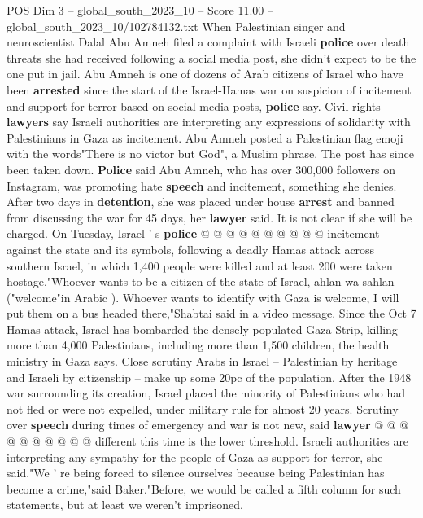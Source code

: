 \begin{textsample}{POS Dim 3 – global\_south\_2023\_10 – Score 11.00 – global\_south\_2023\_10/102784132.txt}  \label{ex:f3_pos_431}
When Palestinian singer and neuroscientist Dalal Abu Amneh filed a complaint with Israeli \textbf{police} over death threats she had received following a social media post, she didn't expect to be the one put in jail.
Abu Amneh is one of dozens of Arab citizens of Israel who have been \textbf{arrested} since the start of the Israel-Hamas war on suspicion of incitement and support for terror based on social media posts, \textbf{police} say.
Civil rights \textbf{lawyers} say Israeli authorities are interpreting any expressions of solidarity with Palestinians in Gaza as incitement.
Abu Amneh posted a Palestinian flag emoji with the words"There is no victor but God", a Muslim phrase.
The post has since been taken down. \textbf{Police} said Abu Amneh, who has over 300,000 followers on Instagram, was promoting hate \textbf{speech} and incitement, something she denies.
After two days in \textbf{detention}, she was placed under house \textbf{arrest} and banned from discussing the war for 45 days, her \textbf{lawyer} said.
It is not clear if she will be charged.
On Tuesday, Israel ' s \textbf{police} @ @ @ @ @ @ @ @ @ @ incitement against the state and its symbols, following a deadly Hamas attack across southern Israel, in which 1,400 people were killed and at least 200 were taken hostage."Whoever wants to be a citizen of the state of Israel, ahlan wa sahlan ("welcome"in Arabic ).
Whoever wants to identify with Gaza is welcome, I will put them on a bus headed there,"Shabtai said in a video message.
Since the Oct 7 Hamas attack, Israel has bombarded the densely populated Gaza Strip, killing more than 4,000 Palestinians, including more than 1,500 children, the health ministry in Gaza says.
Close scrutiny Arabs in Israel -- Palestinian by heritage and Israeli by citizenship -- make up some 20pc of the population.
After the 1948 war surrounding its creation, Israel placed the minority of Palestinians who had not fled or were not expelled, under military rule for almost 20 years.
Scrutiny over \textbf{speech} during times of emergency and war is not new, said \textbf{lawyer} @ @ @ @ @ @ @ @ @ @ different this time is the lower threshold.
Israeli authorities are interpreting any sympathy for the people of Gaza as support for terror, she said."We ' re being forced to silence ourselves because being Palestinian has become a crime,"said Baker."Before, we would be called a fifth column for such statements, but at least we weren't imprisoned.

\end{textsample}
